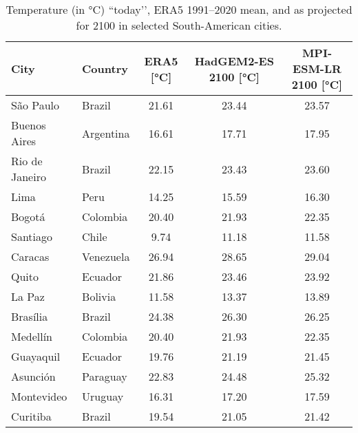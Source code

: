 \begin{table}[ht!]
    \centering
    \renewcommand{\arraystretch}{1.2}
    \begin{footnotesize}
    \begin{tabular}{l l c c c}
        \toprule
        \textbf{City} & \textbf{Country} & \textbf{ERA5 [°C]} & \textbf{HadGEM2-ES 2100 [°C]} & \textbf{MPI-ESM-LR 2100 [°C]} \\
        \midrule
        São Paulo & Brazil & 21.61 & 23.44 & 23.57 \\
        Buenos Aires & Argentina & 16.61 & 17.71 & 17.95 \\
        Rio de Janeiro & Brazil & 22.15 & 23.43 & 23.60 \\
        Lima & Peru & 14.25 & 15.59 & 16.30 \\
        Bogotá & Colombia & 20.40 & 21.93 & 22.35 \\
        Santiago & Chile & 9.74 & 11.18 & 11.58 \\
        Caracas & Venezuela & 26.94 & 28.65 & 29.04 \\
        Quito & Ecuador & 21.86 & 23.46 & 23.92 \\
        La Paz & Bolivia & 11.58 & 13.37 & 13.89 \\
        Brasília & Brazil & 24.38 & 26.30 & 26.25 \\
        Medellín & Colombia & 20.40 & 21.93 & 22.35 \\
        Guayaquil & Ecuador & 19.76 & 21.19 & 21.45 \\
        Asunción & Paraguay & 22.83 & 24.48 & 25.32 \\
        Montevideo & Uruguay & 16.31 & 17.20 & 17.59 \\
        Curitiba & Brazil & 19.54 & 21.05 & 21.42 \\
        \bottomrule
    \end{tabular}
    \end{footnotesize}
    \caption{Temperature (in °C) “today’’, ERA5 1991–2020 mean, and as projected for 2100 in selected South-American cities.}
    \label{tab:temperature_projection}
\end{table}